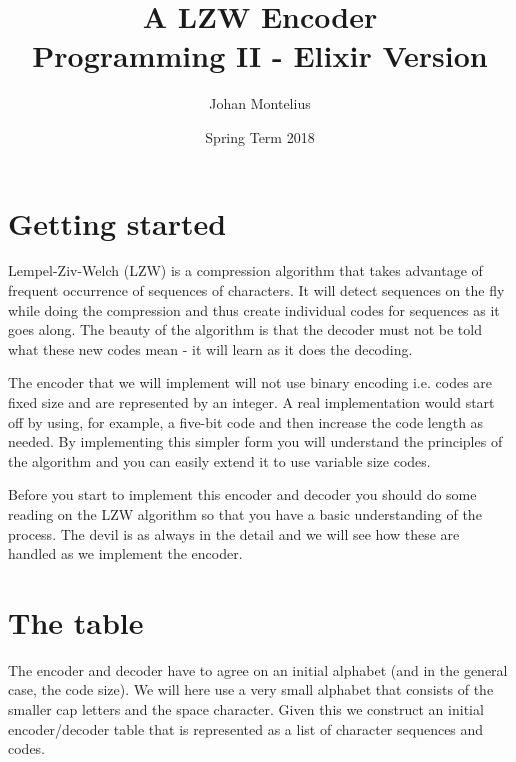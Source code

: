 \documentclass[a4paper,11pt]{article}
\begin{document}

\title{
    \textbf{A LZW Encoder}\\
    \large{Programming II - Elixir Version}
}
\author{Johan Montelius}
\date{Spring Term 2018}
\maketitle
{}



\section*{Getting started}

Lempel-Ziv-Welch (LZW) is a compression algorithm that takes advantage
of frequent occurrence of sequences of characters. It will detect
sequences on the fly while doing the compression and thus create
individual codes for sequences as it goes along. The beauty of the
algorithm is that the decoder must not be told what these new codes
mean - it will learn as it does the decoding.

The encoder that we will implement will not use binary encoding
i.e. codes are fixed size and are represented by an integer. A real
implementation would start off by using, for example, a five-bit code
and then increase the code length as needed. By implementing this
simpler form you will understand the principles of the algorithm and
you can easily extend it to use variable size codes.

Before you start to implement this encoder and decoder you should do
some reading on the LZW algorithm so that you have a basic
understanding of the process. The devil is as always in the detail and
we will see how these are handled as we implement the encoder.



\section{The table}

The encoder and decoder have to agree on an initial alphabet (and in
the general case, the code size). We will here use a very small
alphabet that consists of the smaller cap letters and the space
character. Given this we construct an initial encoder/decoder table
that is represented as a list of character sequences and codes.
\end{document}
